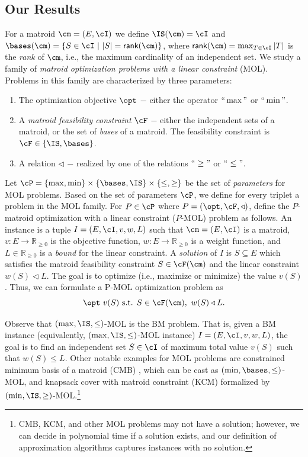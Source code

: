 \subsection{Our Results}

For a matroid $\cm = (E,\cI)$ we define $\IS(\cm) = \cI$ and $\bases(\cm) = \{S \in \cI~|~|S| = \textsf{rank}(\cm)\}$, where $\textsf{rank}(\cm) = \max_{T \in \cI} |T|$ is the {\em rank} of $\cm$, i.e., the maximum cardinality of an independent set. We study a family of {\em matroid optimization problems with a linear constraint} (MOL). Problems in this family are characterized by three parameters: 
\begin{enumerate}
\item[(i)]
The optimization objective $\opt$ $-$ either the operator $``\max"$ or $``\min"$. 
\item[(ii)]
A {\em matroid feasibility constraint} $\cF$ $-$ either the independent sets of a matroid, or the set of {\em bases} of a matroid. The feasibility constraint is $\cF \in \{\IS,\bases\}$.
\item[(iii)]
A relation $\triangleleft$ $-$  realized by one of the relations $``\geq"$ or $``\leq"$. 
\end{enumerate}

Let $\cP = \{\max,\min\} \times \{\bases,\IS\} \times \{\leq ,\geq\}$ be the set of {\em parameters} for MOL problems. 
Based on the set of parameters $\cP$, we define for every triplet a problem
in the MOL family. For $P \in \cP$ where $P = \left(\opt,\cF,\triangleleft\right)$, define the $P$-{\sc matroid optimization with a linear constraint} ($P$-MOL) problem as follows. An instance is a tuple $I = (E,\cI,v,w,L)$ such that $\cm = (E,\cI)$ is a matroid, $v:E \rightarrow \mathbb{R}_{\geq 0}$ is the objective function, $w:E \rightarrow \mathbb{R}_{\geq 0}$ is a weight function, and $L \in \mathbb{R}_{\geq 0}$ is a {\em bound} for the linear constraint. 
A {\em solution} of $I$ is $S \subseteq E$ which satisfies the matroid feasibility constraint $S \in \cF(\cm)$ and the linear constraint $w(S) \triangleleft L$. The goal is to optimize (i.e., maximize or minimize) the value $v(S)$. Thus, we can formulate a P-MOL optimization problem as
\begin{equation}
\label{eq:0}
\opt~ v(S) \text{ s.t. } S \in \cF(\cm),~  w(S) \triangleleft L.
\end{equation} 



Observe that $(\max,\IS,\leq)$-MOL is the BM problem.
That is, given a BM instance (equivalently, $(\max,\IS,\leq)$-MOL instance) $I = (E,\cI,v,w,L)$, the goal is to find an independent set $S \in \cI$ of maximum total value $v(S)$ such that $w(S) \leq L$. Other notable examples for MOL problems are {\sc constrained minimum basis of a matroid} (CMB) \cite{HL04}, which can be cast as $(\min,\bases,\leq)$-MOL, and {\sc knapsack cover with matroid constraint} (KCM) \cite{CCNR13} formalized by $(\min,\IS,\geq)$-MOL.\footnote{CMB, KCM, and other MOL problems may not have a solution; however, we can decide in polynomial time if a solution exists, and our definition of approximation algorithms captures instances with no solution.}



